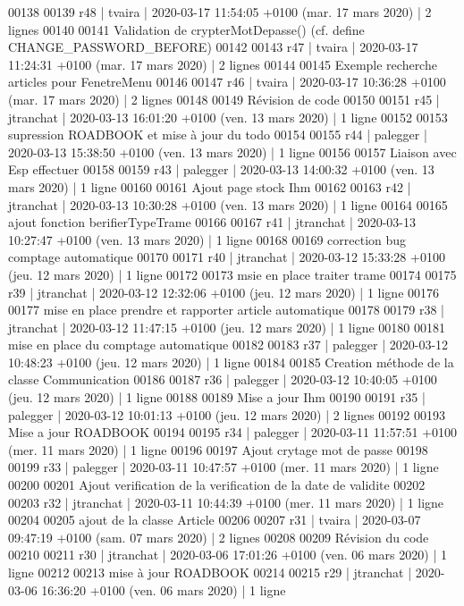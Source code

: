 \begin{DoxyCode}
00138 
00139 r48 | tvaira | 2020-03-17 11:54:05 +0100 (mar. 17 mars 2020) | 2 lignes
00140 
00141 Validation de crypterMotDepasse() (cf. define CHANGE\_PASSWORD\_BEFORE)
00142 
00143 r47 | tvaira | 2020-03-17 11:24:31 +0100 (mar. 17 mars 2020) | 2 lignes
00144 
00145 Exemple recherche articles pour FenetreMenu
00146 
00147 r46 | tvaira | 2020-03-17 10:36:28 +0100 (mar. 17 mars 2020) | 2 lignes
00148 
00149 Révision de code
00150 
00151 r45 | jtranchat | 2020-03-13 16:01:20 +0100 (ven. 13 mars 2020) | 1 ligne
00152 
00153 supression ROADBOOK et mise à jour du todo
00154 
00155 r44 | palegger | 2020-03-13 15:38:50 +0100 (ven. 13 mars 2020) | 1 ligne
00156 
00157 Liaison avec Esp effectuer
00158 
00159 r43 | palegger | 2020-03-13 14:00:32 +0100 (ven. 13 mars 2020) | 1 ligne
00160 
00161 Ajout page stock Ihm
00162 
00163 r42 | jtranchat | 2020-03-13 10:30:28 +0100 (ven. 13 mars 2020) | 1 ligne
00164 
00165 ajout fonction berifierTypeTrame
00166 
00167 r41 | jtranchat | 2020-03-13 10:27:47 +0100 (ven. 13 mars 2020) | 1 ligne
00168 
00169 correction bug comptage automatique
00170 
00171 r40 | jtranchat | 2020-03-12 15:33:28 +0100 (jeu. 12 mars 2020) | 1 ligne
00172 
00173 msie en place traiter trame
00174 
00175 r39 | jtranchat | 2020-03-12 12:32:06 +0100 (jeu. 12 mars 2020) | 1 ligne
00176 
00177 mise en place prendre et rapporter article automatique
00178 
00179 r38 | jtranchat | 2020-03-12 11:47:15 +0100 (jeu. 12 mars 2020) | 1 ligne
00180 
00181 mise en place du comptage automatique
00182 
00183 r37 | palegger | 2020-03-12 10:48:23 +0100 (jeu. 12 mars 2020) | 1 ligne
00184 
00185 Creation méthode de la classe Communication
00186 
00187 r36 | palegger | 2020-03-12 10:40:05 +0100 (jeu. 12 mars 2020) | 1 ligne
00188 
00189 Mise a jour Ihm
00190 
00191 r35 | palegger | 2020-03-12 10:01:13 +0100 (jeu. 12 mars 2020) | 2 lignes
00192 
00193 Mise a jour ROADBOOK
00194 
00195 r34 | palegger | 2020-03-11 11:57:51 +0100 (mer. 11 mars 2020) | 1 ligne
00196 
00197 Ajout crytage mot de passe
00198 
00199 r33 | palegger | 2020-03-11 10:47:57 +0100 (mer. 11 mars 2020) | 1 ligne
00200 
00201 Ajout verification de la verification de la date de validite
00202 
00203 r32 | jtranchat | 2020-03-11 10:44:39 +0100 (mer. 11 mars 2020) | 1 ligne
00204 
00205 ajout de la classe Article
00206 
00207 r31 | tvaira | 2020-03-07 09:47:19 +0100 (sam. 07 mars 2020) | 2 lignes
00208 
00209 Révision du code
00210 
00211 r30 | jtranchat | 2020-03-06 17:01:26 +0100 (ven. 06 mars 2020) | 1 ligne
00212 
00213 mise à jour ROADBOOK
00214 
00215 r29 | jtranchat | 2020-03-06 16:36:20 +0100 (ven. 06 mars 2020) | 1 ligne

\end{DoxyCode}
